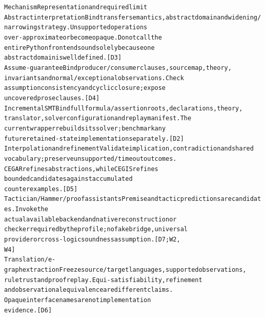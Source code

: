 \begingroup\fontsize{7}{8.4}\selectfont
\begin{alltt}
Mechanism                                    Representation and required limit
Abstract interpretation                      Bind transfer semantics, abstract domain and widening/
                                             narrowing strategy. Unsupported operations
                                             over-approximate or become opaque. Do not call the
                                             entire Python front end sound solely because one
                                             abstract domain is well defined. [D3]
Assume-guarantee                             Bind producer/consumer clauses, source map, theory,
                                             invariants and normal/exceptional observations. Check
                                             assumption consistency and cyclic closure; expose
                                             uncovered prose clauses. [D4]
Incremental SMT                              Bind full formula/assertion roots, declarations, theory,
                                             translator, solver configuration and replay manifest. The
                                             current wrapper rebuilds its solver; benchmark any
                                             future retained-state implementation separately. [D2]
Interpolation and refinement                 Validate implication, contradiction and shared
                                             vocabulary; preserve unsupported/timeout outcomes.
                                             CEGAR refines abstractions, while CEGIS refines
                                             bounded candidates against accumulated
                                             counterexamples. [D5]
Tactician / Hammer / proof assistants        Premise and tactic predictions are candidates. Invoke the
                                             actual available backend and native reconstruction or
                                             checker required by the profile; no fake bridge, universal
                                             provider or cross-logic soundness assumption. [D7; W2,
                                             W4]
Translation / e-graph extraction             Freeze source/target languages, supported observations,
                                             rule trust and proof replay. Equi-satisfiability, refinement
                                             and observational equivalence are different claims.
                                             Opaque interface names are not implementation
                                             evidence. [D6]
\end{alltt}\endgroup


